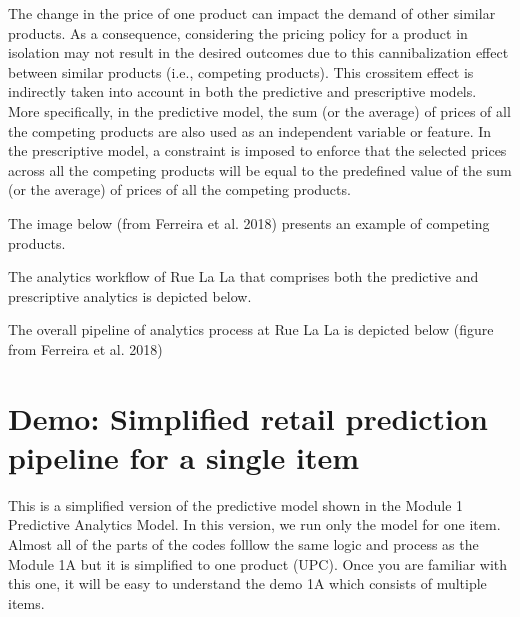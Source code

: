 \documentclass[letterpaper,10pt,english]{jupyterBook}
\begin{document}
\sphinxAtStartPar
{}
The change in the price of one product can impact the demand of other similar products. As a consequence, considering the pricing policy for a product in isolation may  not result in the desired outcomes due to this cannibalization effect between similar products (i.e., competing products). This cross\sphinxhyphen{}item effect is indirectly taken into account in both the predictive and prescriptive models. More specifically, in the predictive model, the sum (or the average) of prices of all the competing products are also used as an independent variable or feature. In the prescriptive model, a constraint is imposed to enforce that the selected prices across all the competing products will be equal to the predefined value of the sum (or the average) of prices of all the competing products.

\sphinxAtStartPar
The image below (from Ferreira et al. 2018) presents an example of competing products.



\sphinxAtStartPar
The analytics workflow of Rue La La that comprises both the predictive and prescriptive analytics is depicted below.


\sphinxAtStartPar
The overall pipeline of analytics process at Rue La La is depicted below (figure from Ferreira et al. 2018)


\sphinxstepscope


\section{Demo: Simplified retail prediction pipeline for a single item}
\label{\detokenize{docs/Case1_1_Simple_Retail_Demand_Model:demo-simplified-retail-prediction-pipeline-for-a-single-item}}\label{\detokenize{docs/Case1_1_Simple_Retail_Demand_Model::doc}}
\sphinxAtStartPar
{}

\sphinxAtStartPar
{}
This is a simplified version of the predictive model shown in the Module 1 \sphinxhyphen{} Predictive Analytics Model. In this version, we run only the model for one item. Almost all of the parts of the codes folllow the same logic and process as the Module 1A  but it is simplified to one product (UPC). Once you are familiar with this one, it will be easy to understand the demo 1A which consists of multiple items.
\end{document}
